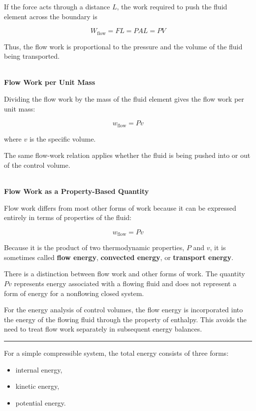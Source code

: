 \documentclass[12pt]{article}
\newcommand{\mysubsection}[2]{%
    \vspace{5px}
    \noindent{\headingfont\large #1\space #2\par}
    \vspace{4pt}
    \hrule
    \vspace{15pt}
}
\begin{document}
If the force acts through a distance $L$, the work required to push the fluid element across the boundary is

\begin{equation*}
W_{\mathrm{flow}}=FL=PAL=PV
\end{equation*}

Thus, the flow work is proportional to the pressure and the volume of the fluid being transported.

\textbf{\\ Flow Work per Unit Mass}

Dividing the flow work by the mass of the fluid element gives the flow work per unit mass:

\begin{equation*}
w_{\mathrm{flow}}=Pv
\end{equation*}

where $v$ is the specific volume.

The same flow-work relation applies whether the fluid is being pushed into or out of the control volume.

\textbf{\\ Flow Work as a Property-Based Quantity}

Flow work differs from most other forms of work because it can be expressed entirely in terms of properties of the fluid:

\begin{equation*}
w_{\mathrm{flow}}=Pv
\end{equation*}

Because it is the product of two thermodynamic properties, $P$ and $v$, it is sometimes called \textbf{flow energy}, \textbf{convected energy}, or \textbf{transport energy}.

There is a distinction between flow work and other forms of work. The quantity $Pv$ represents energy associated with a flowing fluid and does not represent a form of energy for a nonflowing closed system.

For the energy analysis of control volumes, the flow energy is incorporated into the energy of the flowing fluid through the property of enthalpy. This avoids the need to treat flow work separately in subsequent energy balances.

\mysubsection{}{Total Energy of a Flowing Fluid}

For a simple compressible system, the total energy consists of three forms:

\begin{itemize}
    \item internal energy,
    \item kinetic energy,
    \item potential energy.
\end{itemize}
\end{document}
